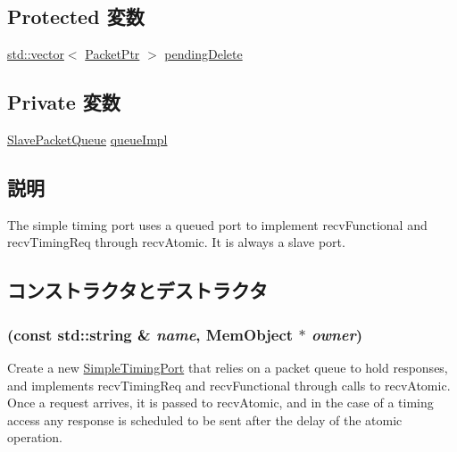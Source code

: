 \subsection*{Protected 変数}
\begin{DoxyCompactItemize}
\item 
\hyperlink{classstd_1_1vector}{std::vector}$<$ \hyperlink{classPacket}{PacketPtr} $>$ \hyperlink{classSimpleTimingPort_a21da4bea3554874b557428e4cce5d4a4}{pendingDelete}
\end{DoxyCompactItemize}
\subsection*{Private 変数}
\begin{DoxyCompactItemize}
\item 
\hyperlink{classSlavePacketQueue}{SlavePacketQueue} \hyperlink{classSimpleTimingPort_ab41143071108edb2c003308b57c50d8e}{queueImpl}
\end{DoxyCompactItemize}


\subsection{説明}
The simple timing port uses a queued port to implement recvFunctional and recvTimingReq through recvAtomic. It is always a slave port. 

\subsection{コンストラクタとデストラクタ}
\hypertarget{classSimpleTimingPort_a2273fa04bdf4a7c437c885569c7df97b}{
\subsubsection[{SimpleTimingPort}]{ (const std::string \& {\em name}, \/  {\bf MemObject} $\ast$ {\em owner})}}
\label{classSimpleTimingPort_a2273fa04bdf4a7c437c885569c7df97b}
Create a new \hyperlink{classSimpleTimingPort}{SimpleTimingPort} that relies on a packet queue to hold responses, and implements recvTimingReq and recvFunctional through calls to recvAtomic. Once a request arrives, it is passed to recvAtomic, and in the case of a timing access any response is scheduled to be sent after the delay of the atomic operation.



